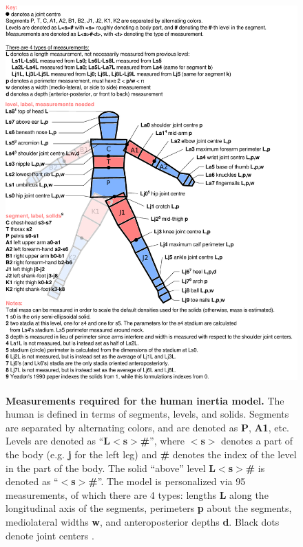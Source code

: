 \documentclass[10pt]{article}
\begin{document}
\begin{figure}[!ht]
  \begin{center}
    \includegraphics[height=6in]{figfactory/measurements.pdf}
  \end{center}
  \caption{
    {\bf Measurements required for the human inertia model.}  The human is
    defined in terms of segments, levels, and solids. Segments are separated by
    alternating colors, and are denoted as \textbf{P}, \textbf{A1}, etc. Levels
    are denoted as ``\textbf{L$<$s$>$\#}'', where \textbf{$<$s$>$} denotes a
    part of the body (e.g. \textbf{j} for the left leg) and \textbf{\#} denotes
    the index of the level in the part of the body. The solid ``above'' level
    \textbf{L$<$s$>$\#} is denoted as ``\textbf{$<$s$>$\#}''. The model is
    personalized via 95 measurements, of which there are 4 types: lengths
    \textbf{L} along the longitudinal axis of the segments, perimeters
    \textbf{p} about the segments, mediolateral widths \textbf{w}, and
    anteroposterior depths \textbf{d}. Black dots denote joint centers
    \cite{Yeadon1990c}.
  }
  \label{fig:meas}
\end{figure}

\end{document}

